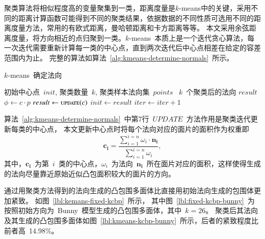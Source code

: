 聚类算法将相似程度高的变量聚集到一类，距离度量是$k$-means中的关键，采用不同的距离计算函数可能得到不同的聚类结果，依据数据的不同性质可选用不同的距离度量方法，常用的有欧式距离，曼哈顿距离和卡方距离等等。
本文采用余弦距离度量，将方向相近的点归聚到一类。$k$-means~本质上是一个迭代贪心算法，每一次迭代需要重新计算每一类的中心点，直到两次迭代后中心点相差在给定的容差范围内为止。
完整的算法如算法~\ref{alg:kmeans-determine-normals}~所示。

\begin{algorithm}
\small
\caption{$k$-means~确定法向}
\label{alg:kmeans-determine-normals}
\begin{algorithmic}[1]
\Require
初始中心点~$init$, 聚类数量~$k$, 聚类样本法向集~$points$
\Ensure
~$k$~个聚类后的法向 $result$
        \State $\phi \gets c \cdot p$ 
    \EndFor
    \State $result \gets \Call{update}{c}$ 
        \State {}
        \State {}
    \Else
        \State $init \gets result $
        \State $iter \gets iter+1 $
    \EndIf
    \EndFor
  \EndFor
\EndFunction
\end{algorithmic}
\end{algorithm}

算法~\ref{alg:kmeans-determine-normals}~中第7行~$UPDATE$~方法作用是聚类迭代更新每类的中心点，
本文更新中心点时将每个法向对应的面片的面积作为权重即
\begin{equation}
\label{equ:kmeans-update-center}
\bm{c_i}=\frac{\sum_{i=1}^{i=n} \omega_i \cdot \bm{n_i} } {\sum_{i=1}^{i=n} \omega_i}
,
\end{equation}
其中，$\bm{c_i}$~为第~$i$~类的中心点，$\omega_i$~为法向~$\bm{n_i}$~所在面片对应的面积，这样使得生成的法向尽量靠近原始近似凸包面积较大的面片的方向。

通过用聚类方法得到的法向生成的凸包围多面体比直接用初始法向生成的包围体更加紧致。
如图~\ref{lbl:kemans-fixed-kcbp}~所示， 
其中图~\ref{lbl:fixed-kcbp-bunny}~为按照初始方向为~Bunny~模型生成的凸包围多面体，其中~$k=26$。
聚类后其法向及其生成的凸包围多面体如图~\ref{lbl:kmeans-kcbp-bunny}~所示，后者的紧致程度比前者高~14.98\%。

